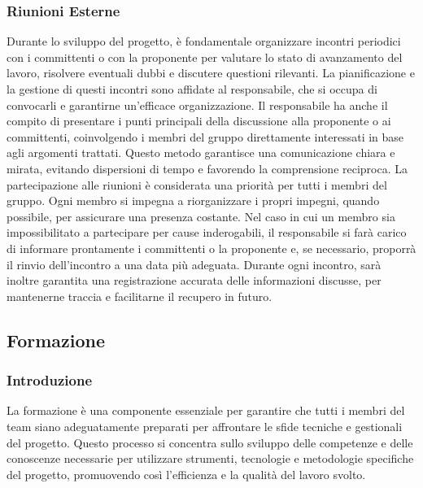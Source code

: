 \subsubsection{Riunioni Esterne}
Durante lo sviluppo del progetto, è fondamentale organizzare incontri periodici con i committenti o con la proponente per valutare lo stato di avanzamento del lavoro, risolvere eventuali dubbi e discutere questioni rilevanti. La pianificazione e la gestione di questi incontri sono affidate al responsabile, che si occupa di convocarli e garantirne un’efficace organizzazione.
Il responsabile ha anche il compito di presentare i punti principali della discussione alla proponente o ai committenti, coinvolgendo i membri del gruppo direttamente interessati in base agli argomenti trattati. Questo metodo garantisce una comunicazione chiara e mirata, evitando dispersioni di tempo e favorendo la comprensione reciproca.
La partecipazione alle riunioni è considerata una priorità per tutti i membri del gruppo. Ogni membro si impegna a riorganizzare i propri impegni, quando possibile, per assicurare una presenza costante. Nel caso in cui un membro sia impossibilitato a partecipare per cause inderogabili, il responsabile si farà carico di informare prontamente i committenti o la proponente e, se necessario, proporrà il rinvio dell’incontro a una data più adeguata. Durante ogni incontro, sarà inoltre garantita una registrazione accurata delle informazioni discusse, per mantenerne traccia e facilitarne il recupero in futuro.

\subsection{Formazione}
\subsubsection{Introduzione}
La formazione è una componente essenziale per garantire che tutti i membri del team siano adeguatamente preparati per affrontare le sfide tecniche e gestionali del progetto. Questo processo si concentra sullo sviluppo delle competenze e delle conoscenze necessarie per utilizzare strumenti, tecnologie e metodologie specifiche del progetto, promuovendo così l’efficienza e la qualità del lavoro svolto.


